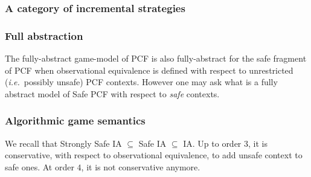 \subsubsection{A category of incremental strategies}


\subsubsection{Full abstraction}

The fully-abstract game-model of PCF is also fully-abstract for the
safe fragment of PCF when observational equivalence is defined with
respect to unrestricted ({\it i.e.}~possibly unsafe) PCF contexts.
However one may ask what is a fully abstract model of Safe PCF with
respect to \emph{safe} contexts.





\subsubsection{Algorithmic game semantics}
We recall that Strongly Safe IA $\subseteq$ Safe IA $\subseteq$ IA.
Up to order $3$, it is conservative, with respect to observational equivalence, to add unsafe context to safe ones.
At order $4$, it is not conservative anymore.

